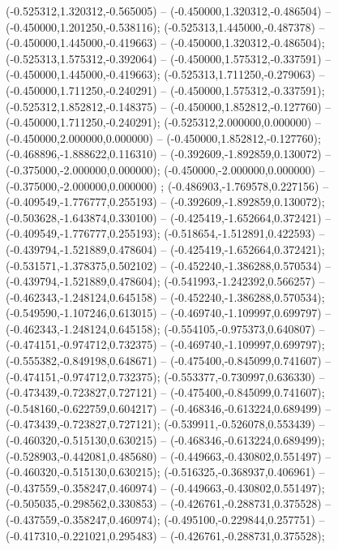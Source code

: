  (-0.525312,1.320312,-0.565005) -- (-0.450000,1.320312,-0.486504) -- (-0.450000,1.201250,-0.538116);
 (-0.525313,1.445000,-0.487378) -- (-0.450000,1.445000,-0.419663) -- (-0.450000,1.320312,-0.486504);
 (-0.525313,1.575312,-0.392064) -- (-0.450000,1.575312,-0.337591) -- (-0.450000,1.445000,-0.419663);
 (-0.525313,1.711250,-0.279063) -- (-0.450000,1.711250,-0.240291) -- (-0.450000,1.575312,-0.337591);
 (-0.525312,1.852812,-0.148375) -- (-0.450000,1.852812,-0.127760) -- (-0.450000,1.711250,-0.240291);
 (-0.525312,2.000000,0.000000) -- (-0.450000,2.000000,0.000000) -- (-0.450000,1.852812,-0.127760);
 (-0.468896,-1.888622,0.116310) -- (-0.392609,-1.892859,0.130072) -- (-0.375000,-2.000000,0.000000);
 (-0.450000,-2.000000,0.000000) -- (-0.375000,-2.000000,0.000000) ;
 (-0.486903,-1.769578,0.227156) -- (-0.409549,-1.776777,0.255193) -- (-0.392609,-1.892859,0.130072);
 (-0.503628,-1.643874,0.330100) -- (-0.425419,-1.652664,0.372421) -- (-0.409549,-1.776777,0.255193);
 (-0.518654,-1.512891,0.422593) -- (-0.439794,-1.521889,0.478604) -- (-0.425419,-1.652664,0.372421);
 (-0.531571,-1.378375,0.502102) -- (-0.452240,-1.386288,0.570534) -- (-0.439794,-1.521889,0.478604);
 (-0.541993,-1.242392,0.566257) -- (-0.462343,-1.248124,0.645158) -- (-0.452240,-1.386288,0.570534);
 (-0.549590,-1.107246,0.613015) -- (-0.469740,-1.109997,0.699797) -- (-0.462343,-1.248124,0.645158);
 (-0.554105,-0.975373,0.640807) -- (-0.474151,-0.974712,0.732375) -- (-0.469740,-1.109997,0.699797);
 (-0.555382,-0.849198,0.648671) -- (-0.475400,-0.845099,0.741607) -- (-0.474151,-0.974712,0.732375);
 (-0.553377,-0.730997,0.636330) -- (-0.473439,-0.723827,0.727121) -- (-0.475400,-0.845099,0.741607);
 (-0.548160,-0.622759,0.604217) -- (-0.468346,-0.613224,0.689499) -- (-0.473439,-0.723827,0.727121);
 (-0.539911,-0.526078,0.553439) -- (-0.460320,-0.515130,0.630215) -- (-0.468346,-0.613224,0.689499);
 (-0.528903,-0.442081,0.485680) -- (-0.449663,-0.430802,0.551497) -- (-0.460320,-0.515130,0.630215);
 (-0.516325,-0.368937,0.406961) -- (-0.437559,-0.358247,0.460974) -- (-0.449663,-0.430802,0.551497);
 (-0.505035,-0.298562,0.330853) -- (-0.426761,-0.288731,0.375528) -- (-0.437559,-0.358247,0.460974);
 (-0.495100,-0.229844,0.257751) -- (-0.417310,-0.221021,0.295483) -- (-0.426761,-0.288731,0.375528);
